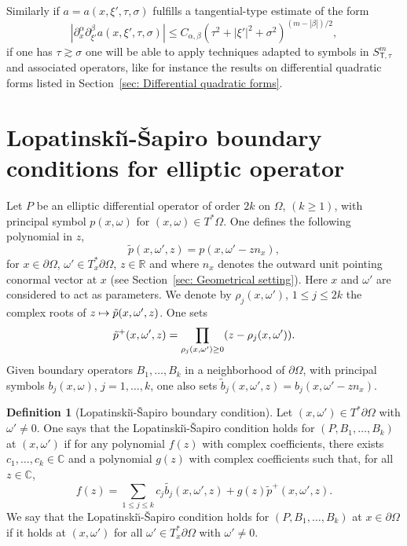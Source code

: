 \documentclass[10pt]{amsart}
\newcommand\mto{\mathchoice{\longmapsto}{\mapsto}{\mapsto}{\mapsto}}
\theoremstyle{plain}
\theoremstyle{definition}
\newtheorem{definition}[theorem]{Definition}
\def\R{\mathbb{R}}
\def\C{\mathbb{C}}
\newcommand{\LS}{Lopatinski\u{\i}-\v{S}apiro\xspace}
\let \Im \relax
\DeclareMathOperator{\Im}{Im}
\newcommand{\Ssct}{S_{{\scriptscriptstyle{\mathsf T}},\tau}}
\begin{document}
Similarly if $a = a(x,\xi',\tau,\sigma)$ fulfills a tangential-type estimate of the form
\begin{equation*}
|\partial^{\alpha}_x\partial^{\beta}_{\xi'} a(x,\xi',\tau,\sigma)|\leq
C_{\alpha,\beta}(\tau^2+|\xi'|^2+\sigma^2)^{(m-|\beta|)/2},
\end{equation*}
if one has $\tau\gtrsim \sigma$ one will be able to apply techniques
adapted to symbols in $\Ssct^m$ and associated operators, like for instance the results on differential quadratic forms listed in
Section~\ref{sec: Differential quadratic forms}.

\section{Lopatinski\u{\i}-\v{S}apiro boundary conditions for elliptic operator}
\label{sec: LS condition}
Let $P$ be an elliptic differential operator of order $2k$ on
$\Omega$, $(k\geq 1)$, with principal symbol $p(x,\omega)$ for
$(x,\omega)\in T^*\Omega$. One defines the following polynomial in
$z$,\vspace*{-3pt}
\[
\tilde{p}(x,\omega',z)=p(x,\omega'-z n_x),
\]
for
$x\in\partial\Omega$, $\omega'\in T^*_x\partial\Omega$, $z\in\R$ and
where $n_x$ denotes the outward unit pointing conormal vector at $x$
(see Section~\ref{sec: Geometrical setting}). Here $x$ and $\omega'$
are considered to act as parameters. We denote by
$\rho_j(x,\omega')$, $1\leq j\leq 2k$ the complex roots of $z \mto \tilde{p}(x,\omega',z)$. One sets
\[
\tilde{p}^+(x,\omega',z)=\prod_{\Im\rho_j(x,\omega')\geq 0}(z-\rho_j(x,\omega')).
\]
Given boundary operators $B_1,\dots, B_k$ in a neighborhood of $\partial\Omega$, with principal symbols $b_j(x,\omega)$, $j=1,\dots,k$, one also sets $\tilde{b}_j(x,\omega',z)=b_j(x,\omega'-zn_x)$.

\begin{definition}[\LS boundary condition]\label{def: LS}
Let $(x,\omega')\in T^*\partial\Omega$ with $\omega'\neq 0$. One says that the \LS condition holds for $(P, B_1,\dots, B_k)$ at $(x,\omega')$ if for any polynomial $f(z)$ with complex coefficients, there exists \hbox{$c_1,\dots,c_k\in\C$} and a polynomial $g(z)$ with complex coefficients such that, for all $z\in\C$,
\[
f(z)=\sum_{1\leq j\leq k}c_j\tilde{b_j}(x,\omega',z)+g(z)\tilde{p}^+(x,\omega',z).
\]
We say that the \LS condition holds for $(P, B_1,\dots, B_k)$ at $x\in\partial\Omega$ if it holds at $(x,\omega')$ for all $\omega'\in T^*_x\partial\Omega$ with $\omega'\neq 0$.
\end{definition}
\end{document}
